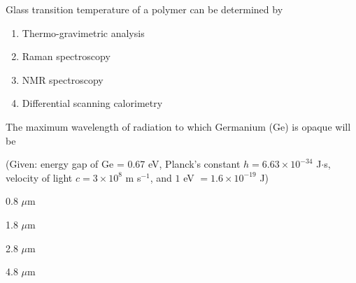 \bigskip

\item Glass transition temperature of a polymer can be determined by

\begin{enumerate}
    \item Thermo-gravimetric analysis
    \item Raman spectroscopy
    \item NMR spectroscopy
    \item Differential scanning calorimetry
\end{enumerate}
\bigskip

\item The maximum wavelength of radiation to which Germanium (Ge) is opaque will be

(Given: energy gap of Ge = 0.67 eV, Planck's constant $h = 6.63 \times 10^{-34}$ J$\cdot$s, velocity of light $c = 3 \times 10^8$ m s$^{-1}$, and $1$ eV $= 1.6 \times 10^{-19}$ J)

\begin{enumerate}
\begin{multicols}{4}
    \item 0.8 $\mu$m
    \item 1.8 $\mu$m
    \item 2.8 $\mu$m
    \item 4.8 $\mu$m
    \end{multicols}
\end{enumerate}



